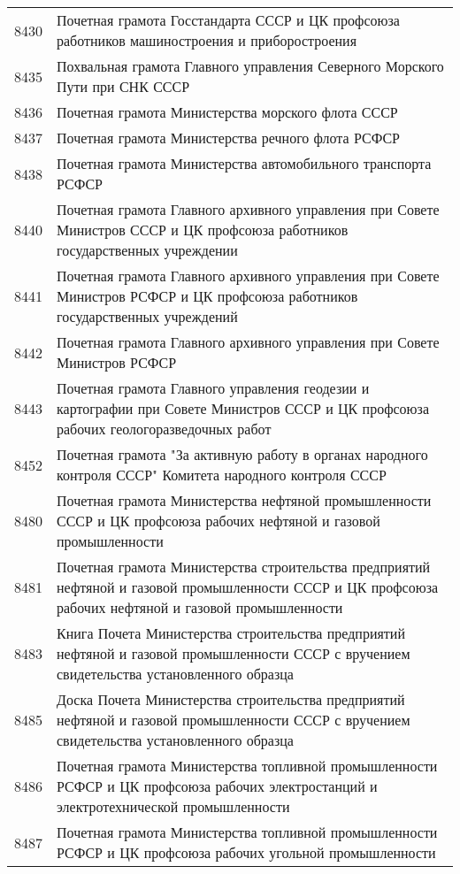 \documentclass[10pt, a4paper, titlepage]{article}
\begin{document}
\begin{center}
\begin{longtable}{rp{}}
        8430 & Почетная грамота Госстандарта СССР и ЦК профсоюза работников машиностроения и приборостроения \\
        8435 & Похвальная грамота Главного управления Северного Морского Пути при СНК СССР \\
        8436 & Почетная грамота Министерства морского флота СССР \\
        8437 & Почетная грамота Министерства речного флота РСФСР \\
        8438 & Почетная грамота Министерства автомобильного транспорта РСФСР \\
        8440 & Почетная грамота Главного архивного управления при Совете Министров СССР и ЦК профсоюза работников государственных учреждении \\
        8441 & Почетная грамота Главного архивного управления при Совете Министров РСФСР и ЦК профсоюза работников государственных учреждений \\
        8442 & Почетная грамота Главного архивного управления при Совете Министров РСФСР \\
        8443 & Почетная грамота Главного управления геодезии и картографии при Совете Министров СССР и ЦК профсоюза рабочих геологоразведочных работ \\
        8452 & Почетная грамота "За активную работу в органах народного контроля СССР" Комитета народного контроля СССР \\
        8480 & Почетная грамота Министерства нефтяной промышленности СССР и ЦК профсоюза рабочих нефтяной и газовой промышленности \\
        8481 & Почетная грамота Министерства строительства предприятий нефтяной и газовой промышленности СССР и ЦК профсоюза рабочих нефтяной и газовой промышленности \\
        8483 & Книга Почета Министерства строительства предприятий нефтяной и газовой промышленности СССР с вручением свидетельства установленного образца \\
        8485 & Доска Почета Министерства строительства предприятий нефтяной и газовой промышленности СССР с вручением свидетельства установленного образца \\
        8486 & Почетная грамота Министерства топливной промышленности РСФСР и ЦК профсоюза рабочих электростанций и электротехнической промышленности \\
        8487 & Почетная грамота Министерства топливной промышленности РСФСР и ЦК профсоюза рабочих угольной промышленности \\

\end{longtable}
\end{center}
\end{document}
